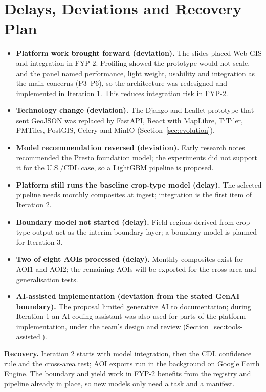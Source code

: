 \section{Delays, Deviations and Recovery Plan}
\begin{itemize}
  \item \textbf{Platform work brought forward (deviation).} The slides placed Web GIS and integration in
        FYP-2. Profiling showed the prototype would not scale, and the panel named performance,
        light weight, usability and integration as the main concerns (P3--P6), so the architecture
        was redesigned and implemented in Iteration 1. This reduces
        integration risk in FYP-2.
  \item \textbf{Technology change (deviation).} The Django and Leaflet prototype that sent GeoJSON was
        replaced by FastAPI, React with MapLibre, TiTiler, PMTiles, PostGIS, Celery and MinIO
        (Section~\ref{sec:evolution}).
  \item \textbf{Model recommendation reversed (deviation).} Early research notes recommended the
        Presto foundation model; the experiments did not support it for the U.S./CDL case, so a
        LightGBM pipeline is proposed.
  \item \textbf{Platform still runs the baseline crop-type model (delay).} The selected pipeline needs
        monthly composites at ingest; integration is the first item of Iteration 2.
  \item \textbf{Boundary model not started (delay).} Field regions derived from crop-type output act as
        the interim boundary layer; a boundary model is planned for Iteration 3.
  \item \textbf{Two of eight AOIs processed (delay).} Monthly composites exist for AOI1 and AOI2; the
        remaining AOIs will be exported for the cross-area and generalisation tests.
  \item \textbf{AI-assisted implementation (deviation from the stated GenAI boundary).} The proposal
        limited generative AI to documentation; during Iteration 1 an AI coding assistant was also
        used for parts of the platform implementation, under the team's design and review
        (Section~\ref{sec:tools-assisted}).
\end{itemize}
\textbf{Recovery.} Iteration 2 starts with model integration, then the CDL confidence rule and the
cross-area test; AOI exports run in the background on Google Earth Engine. The boundary and yield
work in FYP-2 benefits from the registry and pipeline already in place, so new models only need a
task and a manifest.
